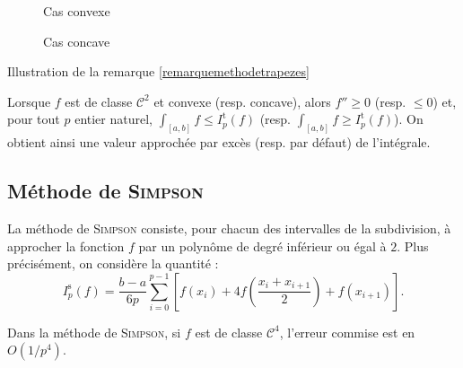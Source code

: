 \begin{marginfigure}[-1cm]
\begin{subfigure}{.5\textwidth}
    \centering
    
    \caption{Cas convexe}
\end{subfigure}%
\begin{subfigure}{.5\textwidth}
    \centering
    
    \caption{Cas concave}
\end{subfigure}
\caption{Illustration de la remarque \ref{remarquemethodetrapezes}}
\end{marginfigure}

\begin{remarque}\label{remarquemethodetrapezes}
Lorsque $f$ est de classe $\mathscr{C}^2$ et convexe (resp. concave), alors $f'' \geqslant 0$ (resp. $\leqslant 0$) et, pour tout $p$ entier naturel, \mbox{$\int_{[a,b]} f \leqslant I_p^\mathrm{t}(f)$} (resp. \mbox{$\int_{[a,b]} f \geqslant I_p^\mathrm{t}(f)$}). On obtient ainsi une valeur approchée par excès (resp. par défaut) de l'intégrale.
\end{remarque}

\subsection{Méthode de \textsc{Simpson}}

La méthode de \textsc{Simpson} consiste, pour chacun des intervalles de la subdivision, à approcher la fonction $f$ par un polynôme de degré inférieur ou égal à $2$. Plus précisément, on considère la quantité :
\[
I_p^\mathrm{s}(f) = \frac{b-a}{6 p} \sum_{i=0}^{p-1} \left[f(x_i)+ 4 f\left(\frac{x_i + x_{i+1}}{2}\right) + f(x_{i+1})\right].
\]

\begin{prop}
Dans la méthode de \textsc{Simpson}, si $f$ est de classe $\mathscr{C}^4$, l'erreur commise est en $O(1/p^4)$.
\end{prop}


